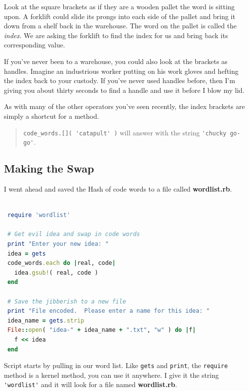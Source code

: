 \documentclass[10pt,twoside]{report}
\begin{document}
Look at the square brackets as if they are a wooden pallet the word is
sitting upon. A forklift could slide its prongs into each side of the
pallet and bring it down from a shelf back in the warehouse.  The word
on the pallet is called the {\em index}. We are asking the forklift to
find the index for us and bring back its corresponding value.

If you've never been to a warehouse, you could also look at the
brackets as handles. Imagine an industrious worker putting on his work
gloves and hefting the index back to your custody.  If you've never
used handles before, then I'm giving you about thirty seconds to find
a handle and use it before I blow my lid.

As with many of the other operators you've seen recently, the index
brackets are simply a shortcut for a method.

\begin{quote}
\lstinline[breaklines=true]|code_words.[]( 'catapult' )| will answer
with the string \lstinline[breaklines=true]|'chucky go-go'|.\end{quote}




\subsection{Making the Swap}



I went ahead and saved the Hash of code words to a file called {\bf
  wordlist.rb}.


\begin{lstlisting}[basicstyle=\ttfamily\color{basiccolor},
    commentstyle = \ttfamily\color{commentcolor},
    keywordstyle=\ttfamily\color{keywordscolor},
    stringstyle=\color{stringcolor},
    language=Ruby,
    basicstyle=\small\ttfamily,
    showstringspaces=false,
  ]

 require 'wordlist'

 # Get evil idea and swap in code words
 print "Enter your new idea: "
 idea = gets
 code_words.each do |real, code|
   idea.gsub!( real, code )
 end

 # Save the jibberish to a new file
 print "File encoded.  Please enter a name for this idea: "
 idea_name = gets.strip
 File::open( "idea-" + idea_name + ".txt", "w" ) do |f|
   f << idea
 end

\end{lstlisting}

Script starts by pulling in our word list.  Like
\lstinline[breaklines=true]|gets| and
\lstinline[breaklines=true]|print|, the
\lstinline[breaklines=true]|require| method is a kernel method, you
can use it anywhere.  I give it the string
\lstinline[breaklines=true]|'wordlist'| and it will look for a file
named {\bf wordlist.rb}.
\end{document}
